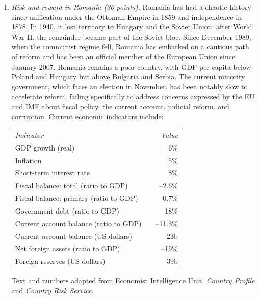 \documentclass[letterpaper,12pt]{article}
\begin{document}
\begin{enumerate}
\item {\it Risk and reward in Romania (30 points).\/} 
Romania has had a chaotic history since unification 
under the Ottoman Empire in 1859 and independence in 1878.
In 1940, it lost territory to Hungary and the Soviet Union; 
after World War II, the remainder became part of the Soviet bloc.  
Since December 1989, when the communist regime fell, 
Romania has embarked on a cautious path of reform 
and has been an official member of the European Union since January 2007.
Romania remains a poor country, 
with GDP per capita below Poland and Hungary 
but above Bulgaria and Serbia.  
The current minority government, which faces an election in November, 
has been notably slow to accelerate reform, 
failing specifically to address concerns expressed by the EU and IMF 
about fiscal policy, the current account, judicial reform, and corruption. 
Current economic indicators include:
%
\begin{center}
\begin{tabular}{lcr}
  {\it Indicator}   &&  {\it Value}     \\
  GDP growth (real) &&  6\%       \\
  Inflation         &&  5\%       \\
  Short-term interest rate &&  8\%   \\
  Fiscal balance:  total  (ratio to GDP)    &&  --2.6\%  \\
  Fiscal balance:  primary  (ratio to GDP)  &&  --0.7\%   \\
  Government debt (ratio to GDP)            &&  18\%       \\
  Current account balance (ratio to GDP)    &&  --11.3\%   \\
  Current account balance (US dollars) &&   --23b   \\
  Net foreign assets (ratio to GDP)         &&   --19\%   \\
  Foreign reserves (US dollars)           &&  39b  \\
\end{tabular}
\end{center}
%
Text and numbers adapted from Economist Intelligence Unit, 
{\it Country Profile\/} and {\it Country Risk Service\/}.  

\begin{enumerate}


\end{enumerate}
\end{enumerate}
\end{document}
